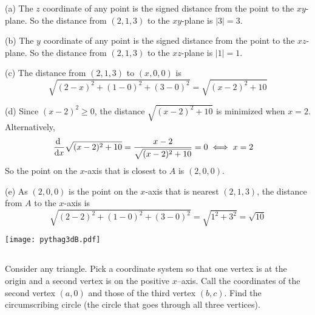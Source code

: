 \begin{solution}
(a) The $z$ coordinate of any point is the signed distance from the point to the
$xy$-plane. So the distance from $(2,1,3)$ to the $xy$-plane is $|3|=3$. 

(b) The $y$ coordinate of any point is the signed distance from the point to the
$xz$-plane. So the distance from $(2,1,3)$ to the $xz$-plane is $|1|=1$.

(c) The distance from $(2,1,3)$ to $(x,0,0)$ is
\begin{equation*}
\sqrt{(2-x)^2 + (1-0)^2 + (3-0)^2} = \sqrt{(x-2)^2 + 10}
\end{equation*}

(d) Since $(x-2)^2\ge 0$, the distance $\sqrt{(x-2)^2 + 10}$ is minimized when 
$x=2$. Alternatively,
\begin{align*}
\diff{}{x} \sqrt{(x-2)^2 + 10}
=\frac{x-2}{\sqrt{(x-2)^2 + 10}}
=0 &\iff x=2
\end{align*}
So the point on the $x$-axis that is closest to $A$ is $(2,0,0)$.

(e) As $(2,0,0)$ is the point on the $x$-axis that is nearest $(2,1,3)$,
the distance from $A$ to the $x$-axis is 
\begin{equation*}
\sqrt{(2-2)^2 + (1-0)^2 + (3-0)^2} = \sqrt{1^2+3^2} = \sqrt{10}
\end{equation*}

\begin{center}
     \texttt{[image: pythag3dB.pdf]}
\end{center}
\end{solution}






\subsection*{\Procedural}


\begin{question}
Consider any triangle. Pick a coordinate system so that one vertex
is at the origin and a second vertex is on the positive $x$--axis. Call
the coordinates of the second vertex $(a,0)$ and those of the third vertex
$(b,c)$. Find the circumscribing circle (the circle that goes through all
three vertices).
\end{question}

%


